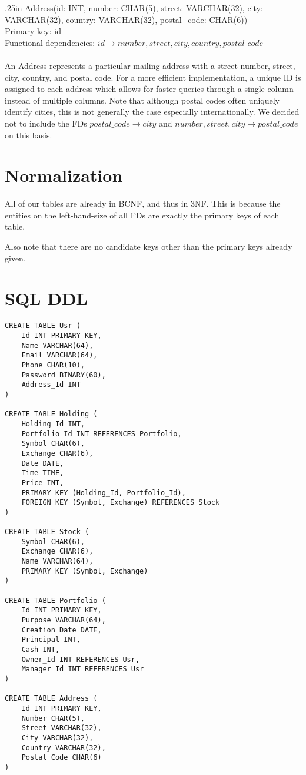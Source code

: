\documentclass[letterpaper]{report}
\begin{document}
\hangindent .25in
{\sffamily Address(\underline{id}: INT, number: CHAR(5), street: VARCHAR(32), city: VARCHAR(32), country: VARCHAR(32), postal\_code: CHAR(6))}\\
Primary key: {\sffamily id} \\
Functional dependencies: $id \to number, street, city, country, postal\_code$ \\\\
An {\sffamily Address} represents a particular mailing address with a street number, street, city, country, and postal code. For a more efficient implementation, a unique ID is assigned to each address which allows for faster queries through a single column instead of multiple columns. Note that although postal codes often uniquely identify cities, this is not generally the case especially internationally. We decided not to include the FDs $postal\_code \to city$ and $number, street, city \to postal\_code$ on this basis.

\section*{Normalization}
All of our tables are already in BCNF, and thus in 3NF. This is because the entities on the left-hand-size of all FDs are exactly the primary keys of each table.

Also note that there are no candidate keys other than the primary keys already given.

\section*{SQL DDL}
\begin{verbatim}
CREATE TABLE Usr (
    Id INT PRIMARY KEY,
    Name VARCHAR(64),
    Email VARCHAR(64),
    Phone CHAR(10),
    Password BINARY(60),
    Address_Id INT
)

CREATE TABLE Holding (
    Holding_Id INT,
    Portfolio_Id INT REFERENCES Portfolio,
    Symbol CHAR(6),
    Exchange CHAR(6),
    Date DATE,
    Time TIME,
    Price INT,
    PRIMARY KEY (Holding_Id, Portfolio_Id),
    FOREIGN KEY (Symbol, Exchange) REFERENCES Stock
)

CREATE TABLE Stock (
    Symbol CHAR(6),
    Exchange CHAR(6),
    Name VARCHAR(64),
    PRIMARY KEY (Symbol, Exchange)
)

CREATE TABLE Portfolio (
    Id INT PRIMARY KEY,
    Purpose VARCHAR(64),
    Creation_Date DATE,
    Principal INT,
    Cash INT,
    Owner_Id INT REFERENCES Usr,
    Manager_Id INT REFERENCES Usr
)

CREATE TABLE Address (
    Id INT PRIMARY KEY,
    Number CHAR(5),
    Street VARCHAR(32),
    City VARCHAR(32),
    Country VARCHAR(32),
    Postal_Code CHAR(6)
)
\end{verbatim}
\end{document}
